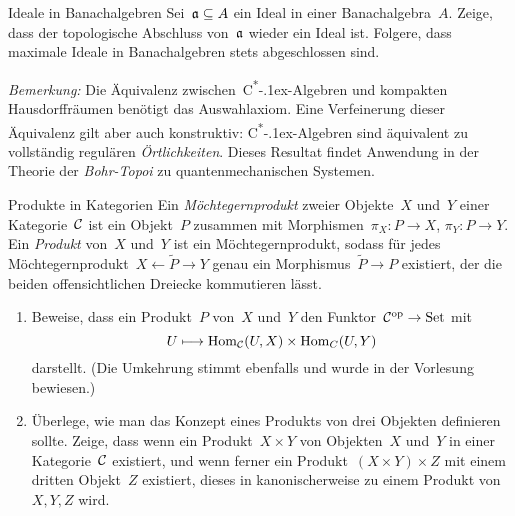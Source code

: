\documentclass{uebblatt}
\begin{document}
\begin{aufgabe}{Ideale in Banachalgebren}
Sei~$\mathfrak{a} \subseteq A$ ein Ideal in einer Banachalgebra~$A$. Zeige, dass der
topologische Abschluss von~$\mathfrak{a}$ wieder ein Ideal ist. Folgere, dass maximale
Ideale in Banachalgebren stets abgeschlossen sind.

\emph{Bemerkung:} Die Äquivalenz
zwischen~C\textsuperscript{*}\kern-.1ex-Alge\-bren und kompakten
Hausdorffräumen benötigt das Auswahlaxiom. Eine Verfeinerung dieser Äquivalenz
gilt aber auch konstruktiv: C\textsuperscript{*}\kern-.1ex-Alge\-bren sind
äquivalent zu vollständig regulären \emph{Örtlichkeiten}. Dieses Resultat
findet Anwendung in der Theorie der \emph{Bohr-Topoi} zu
quantenmechanischen Systemen.
\end{aufgabe}

\begin{aufgabe}{Produkte in Kategorien}
Ein \emph{Möchtegernprodukt} zweier Objekte~$X$ und~$Y$ einer Kategorie~$\mathcal{C}$ ist ein
Objekt~$P$ zusammen mit Morphismen~$\pi_X : P \to X$, $\pi_Y : P \to Y$. Ein
\emph{Produkt} von~$X$ und~$Y$ ist ein Möchtegernprodukt, sodass für jedes
Möchtegernprodukt~$X \leftarrow \widetilde P \to Y$ genau ein Morphismus~$\widetilde
P \to P$ existiert, der die beiden offensichtlichen Dreiecke kommutieren lässt.
\begin{enumerate}
\item Beweise, dass ein Produkt~$P$ von~$X$ und~$Y$ den Funktor~$\mathcal{C}^{\mathrm{op}} \to
\mathrm{Set}$ mit
\[ U \longmapsto \mathrm{Hom}_{\mathcal{C}}(U,X) \times \mathrm{Hom}_C(U,Y) \]
darstellt. (Die Umkehrung stimmt ebenfalls und wurde in der Vorlesung bewiesen.)

\item Überlege, wie man das Konzept eines Produkts von drei Objekten definieren
sollte. Zeige, dass wenn ein Produkt~$X \times Y$ von Objekten~$X$ und~$Y$
in einer Kategorie~$\mathcal{C}$ existiert, und wenn ferner ein Produkt~$(X \times Y)
\times Z$ mit einem dritten Objekt~$Z$ existiert, dieses in kanonischerweise zu
einem Produkt von~$X,Y,Z$ wird.
\end{enumerate}
\end{aufgabe}
\end{document}
